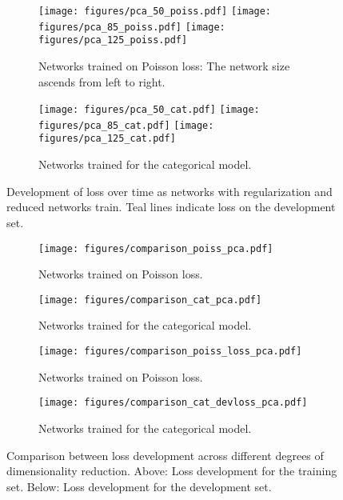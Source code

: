 \documentclass[10pt, twoside, a4paper]{article}
\begin{document}
	\begin{figure}
	\begin{center}
	\begin{subfigure}[b]{17cm}
	\texttt{[image: figures/pca\_50\_poiss.pdf]}
	\texttt{[image: figures/pca\_85\_poiss.pdf]}
	\texttt{[image: figures/pca\_125\_poiss.pdf]}
	\caption{Networks trained on Poisson loss: The network size ascends from left to right.}
	\end{subfigure}
	\begin{subfigure}[b]{17cm}
	\texttt{[image: figures/pca\_50\_cat.pdf]}
	\texttt{[image: figures/pca\_85\_cat.pdf]}
	\texttt{[image: figures/pca\_125\_cat.pdf]}
	\caption{Networks trained for the categorical model.}
	\end{subfigure}
	\end{center}
	\caption{Development of loss over time as networks with regularization and reduced networks train. Teal lines indicate loss on the development set.}
	\label{fig:pcameasure}
	\end{figure}

	\begin{figure}
	\begin{center}
	\begin{subfigure}[b]{8.5cm}
	\texttt{[image: figures/comparison\_poiss\_pca.pdf]}
	\caption{Networks trained on Poisson loss.}
	\end{subfigure}
	\begin{subfigure}[b]{7.5cm}
	\texttt{[image: figures/comparison\_cat\_pca.pdf]}
	\caption{Networks trained for the categorical model.}
	\end{subfigure}
	\begin{subfigure}[b]{8.5cm}
	\texttt{[image: figures/comparison\_poiss\_loss\_pca.pdf]}
	\caption{Networks trained on Poisson loss.}
	\end{subfigure}
	\begin{subfigure}[b]{7.5cm}
	\texttt{[image: figures/comparison\_cat\_devloss\_pca.pdf]}
	\caption{Networks trained for the categorical model.}
	\end{subfigure}

	\end{center}
	\caption{Comparison between loss development across different degrees of dimensionality reduction. Above: Loss development for the training set. Below: Loss development for the development set.}
	\label{fig:pcaconv}
	
	\end{figure}
\end{document}
